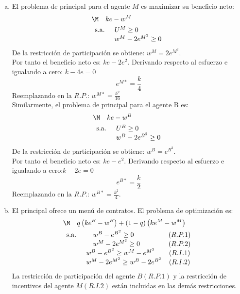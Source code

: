 \begin{enumerate}[a)]
	\item El problema de principal para el agente $M$ es maximizar su beneficio neto: 
					\begin{align*}
						& \M \quad k e-w^{M}\\
						& \begin{array}{ll}
							\text{s.a. } & U^{M} \geq 0\\
										  & w^{M}-2 e^{M^{2}} \geq 0
						\end{array}
					\end{align*}
			De la restricción de participación se obtiene: $w^{M}=2 e^{M^{2}}$.\\
			
			Por tanto el beneficio neto es: $k e-2e^{2}$. Derivando respecto al esfuerzo e igualando a cero: $k-4e=0$ 
				$$e^{M*}=\frac{k}{4}$$
			Reemplazando en la $R.P.$: $w^{M*} =\frac{k^{2}}{16}$\\
			
			Similarmente, el problema de principal para el agente B es:
					\begin{align*}
						& \M \quad k e-w^{B}\\
						& \begin{array}{ll}
							\text{s.a. } & U^{B} \geq 0\\
										  & w^{B}-2e^{B^{2}} \geq 0
						\end{array}
					\end{align*}
			De la restricción de participación se obtiene: $w^{B}=e^{B^{2}}$.\\
			
			Por tanto el beneficio neto es: $ke-e^{2}$. Derivando respecto al esfuerzo e igualando a cero:$k-2e=0$
				$$e^{B*}=\frac{k}{2}$$
			Reemplazando en la $R.P.$: $w^{B*}=\frac{k^{2}}{4}$.
	\item El principal ofrece un menú de contratos. El problema de optimización es: 
					\begin{align*}
						& \M \quad q\left(ke^{B}-w^{B}\right)+(1-q)\left(ke^{M}-w^{M}\right)\\
						& \begin{array}{llc}
							\text{s.a. } & \quad w^{B}-e^{B^{2}} \geq 0 & (R.P.1)\\
										  & \quad w^{M}-2 e^{M^{2}} \geq 0 & (R.P.2) \\
										  & w^{B}-e^{B^{2}} \geq w^{M}-e^{M^{2}} & (R.I.1) \\
										  & w^{M}-2 e^{M^{2}} \geq w^{B}-2 e^{B^{2}} & (R.I.2)
							\end{array}
					\end{align*}
			La restricción de participación del agente $B (R.P.1)$ y la restricción de incentivos del agente $M (R.I.2)$ están incluidas en las demás restricciones.\\
			

\end{enumerate}
